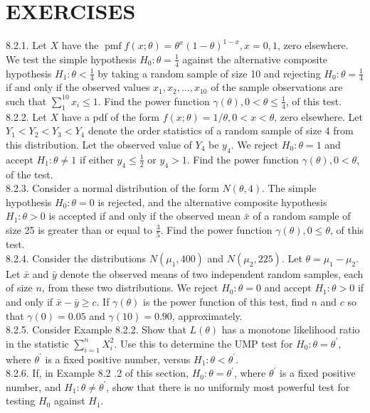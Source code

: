 \section*{EXERCISES}
8.2.1. Let $X$ have the $\operatorname{pmf} f(x ; \theta)=\theta^{x}(1-\theta)^{1-x}, x=0,1$, zero elsewhere. We test the simple hypothesis $H_{0}: \theta=\frac{1}{4}$ against the alternative composite hypothesis $H_{1}: \theta<\frac{1}{4}$ by taking a random sample of size 10 and rejecting $H_{0}: \theta=\frac{1}{4}$ if and only if the observed values $x_{1}, x_{2}, \ldots, x_{10}$ of the sample observations are such that $\sum_{1}^{10} x_{i} \leq 1$. Find the power function $\gamma(\theta), 0<\theta \leq \frac{1}{4}$, of this test.\\
8.2.2. Let $X$ have a pdf of the form $f(x ; \theta)=1 / \theta, 0<x<\theta$, zero elsewhere. Let $Y_{1}<Y_{2}<Y_{3}<Y_{4}$ denote the order statistics of a random sample of size 4 from this distribution. Let the observed value of $Y_{4}$ be $y_{4}$. We reject $H_{0}: \theta=1$ and accept $H_{1}: \theta \neq 1$ if either $y_{4} \leq \frac{1}{2}$ or $y_{4}>1$. Find the power function $\gamma(\theta), 0<\theta$, of the test.\\
8.2.3. Consider a normal distribution of the form $N(\theta, 4)$. The simple hypothesis $H_{0}: \theta=0$ is rejected, and the alternative composite hypothesis $H_{1}: \theta>0$ is accepted if and only if the observed mean $\bar{x}$ of a random sample of size 25 is greater than or equal to $\frac{3}{5}$. Find the power function $\gamma(\theta), 0 \leq \theta$, of this test.\\
8.2.4. Consider the distributions $N\left(\mu_{1}, 400\right)$ and $N\left(\mu_{2}, 225\right)$. Let $\theta=\mu_{1}-\mu_{2}$. Let $\bar{x}$ and $\bar{y}$ denote the observed means of two independent random samples, each of size $n$, from these two distributions. We reject $H_{0}: \theta=0$ and accept $H_{1}: \theta>0$ if and only if $\bar{x}-\bar{y} \geq c$. If $\gamma(\theta)$ is the power function of this test, find $n$ and $c$ so that $\gamma(0)=0.05$ and $\gamma(10)=0.90$, approximately.\\
8.2.5. Consider Example 8.2.2. Show that $L(\theta)$ has a monotone likelihood ratio in the statistic $\sum_{i=1}^{n} X_{i}^{2}$. Use this to determine the UMP test for $H_{0}: \theta=\theta^{\prime}$, where $\theta^{\prime}$ is a fixed positive number, versus $H_{1}: \theta<\theta^{\prime}$.\\
8.2.6. If, in Example 8.2 .2 of this section, $H_{0}: \theta=\theta^{\prime}$, where $\theta^{\prime}$ is a fixed positive number, and $H_{1}: \theta \neq \theta^{\prime}$, show that there is no uniformly most powerful test for testing $H_{0}$ against $H_{1}$.\\
